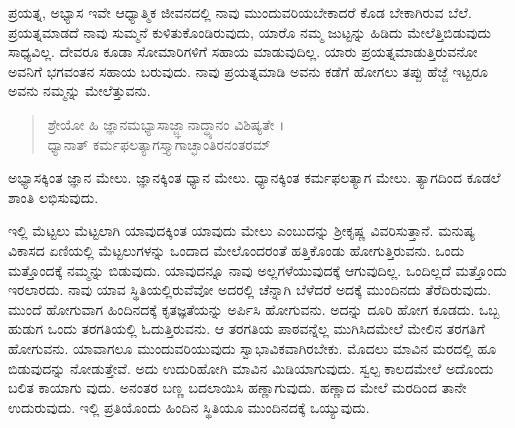 ಪ್ರಯತ್ನ, ಅಭ್ಯಾಸ ಇವೇ ಆಧ್ಯಾತ್ಮಿಕ ಜೀವನದಲ್ಲಿ ನಾವು ಮುಂದುವರಿಯಬೇಕಾದರೆ ಕೊಡ ಬೇಕಾಗಿರುವ ಬೆಲೆ. ಪ್ರಯತ್ನಮಾಡದೆ ನಾವು ಸುಮ್ಮನೆ ಕುಳಿತುಕೊಂಡಿರುವುದು, ಯಾರೊ ನಮ್ಮ ಜುಟ್ಟನ್ನು ಹಿಡಿದು ಮೇಲೆತ್ತಿಬಿಡುವುದು ಸಾಧ್ಯವಿಲ್ಲ. ದೇವರೂ ಕೂಡಾ ಸೋಮಾರಿಗಳಿಗೆ ಸಹಾಯ ಮಾಡುವುದಿಲ್ಲ. ಯಾರು ಪ್ರಯತ್ನಮಾಡುತ್ತಿರುವನೋ ಅವನಿಗೆ ಭಗವಂತನ ಸಹಾಯ ಬರುವುದು. ನಾವು ಪ್ರಯತ್ನಮಾಡಿ ಅವನು ಕಡೆಗೆ ಹೋಗಲು ತಪ್ಪು ಹೆಜ್ಜೆ ಇಟ್ಟರೂ ಅವನು ನಮ್ಮನ್ನು ಮೇಲೆತ್ತುವನು.

\begin{verse}
ಶ್ರೇಯೋ ಹಿ ಜ್ಞಾನಮಭ್ಯಾಸಾಜ್ಜ್ಞಾನಾದ್ಧ್ಯಾನಂ ವಿಶಿಷ್ಯತೇ ।\\ಧ್ಯಾನಾತ್ ಕರ್ಮಫಲತ್ಯಾಗಸ್ತ್ಯಾಗಾಚ್ಛಾಂತಿರನಂತರಮ್ 
\end{verse}

{\small ಅಭ್ಯಾಸಕ್ಕಿಂತ ಜ್ಞಾನ ಮೇಲು. ಜ್ಞಾನಕ್ಕಿಂತ ಧ್ಯಾನ ಮೇಲು. ಧ್ಯಾನಕ್ಕಿಂತ ಕರ್ಮಫಲತ್ಯಾಗ ಮೇಲು. ತ್ಯಾಗದಿಂದ ಕೂಡಲೆ ಶಾಂತಿ ಲಭಿಸುವುದು.}

ಇಲ್ಲಿ ಮೆಟ್ಟಲು ಮೆಟ್ಟಲಾಗಿ ಯಾವುದಕ್ಕಿಂತ ಯಾವುದು ಮೇಲು ಎಂಬುದನ್ನು ಶ್ರೀಕೃಷ್ಣ ವಿವರಿಸುತ್ತಾನೆ. ಮನುಷ್ಯ ವಿಕಾಸದ ಏಣಿಯಲ್ಲಿ ಮೆಟ್ಟಲುಗಳನ್ನು ಒಂದಾದ ಮೇಲೊಂದರಂತೆ ಹತ್ತಿಕೊಂಡು ಹೋಗುತ್ತಿರುವನು. ಒಂದು ಮತ್ತೊಂದಕ್ಕೆ ನಮ್ಮನ್ನು ಬಿಡುವುದು. ಯಾವುದನ್ನೂ ನಾವು ಅಲ್ಲಗಳೆಯುವುದಕ್ಕೆ ಆಗುವುದಿಲ್ಲ. ಒಂದಿಲ್ಲದೆ ಮತ್ತೊಂದು ಇರಲಾರದು. ನಾವು ಯಾವ ಸ್ಥಿತಿಯಲ್ಲಿರುವೆವೋ ಅದರಲ್ಲಿ ಚೆನ್ನಾಗಿ ಬೆಳೆದರೆ ಅದಕ್ಕೆ ಮುಂದಿನದು ತೆರೆದಿರುವುದು. ಮುಂದೆ ಹೋಗುವಾಗ ಹಿಂದಿನದಕ್ಕೆ ಕೃತಜ್ಞತೆಯನ್ನು ಅರ್ಪಿಸಿ ಹೋಗುವನು. ಅದನ್ನು ದೂರಿ ಹೋಗ ಕೂಡದು. ಒಬ್ಬ ಹುಡುಗ ಒಂದು ತರಗತಿಯಲ್ಲಿ ಓದುತ್ತಿರುವನು. ಆ ತರಗತಿಯ ಪಾಠವನ್ನೆಲ್ಲ ಮುಗಿಸಿದಮೇಲೆ ಮೇಲಿನ ತರಗತಿಗೆ ಹೋಗುವನು. ಯಾವಾಗಲೂ ಮುಂದುವರಿಯುವುದು ಸ್ವಾಭಾವಿಕವಾಗಿರಬೇಕು. ಮೊದಲು ಮಾವಿನ ಮರದಲ್ಲಿ ಹೂ ಬಿಡುವುದನ್ನು ನೋಡುತ್ತೇವೆ. ಅದು ಉದುರಿಹೋಗಿ ಮಾವಿನ ಮಿಡಿಯಾಗುವುದು. ಸ್ವಲ್ಪ ಕಾಲದಮೇಲೆ ಅದೊಂದು ಬಲಿತ ಕಾಯಾಗು ವುದು. ಅನಂತರ ಬಣ್ಣ ಬದಲಾಯಿಸಿ ಹಣ್ಣಾಗುವುದು. ಹಣ್ಣಾದ ಮೇಲೆ ಮರದಿಂದ ತಾನೇ ಉದುರುವುದು. ಇಲ್ಲಿ ಪ್ರತಿಯೊಂದು ಹಿಂದಿನ ಸ್ಥಿತಿಯೂ ಮುಂದಿನದಕ್ಕೆ ಒಯ್ಯುವುದು.


